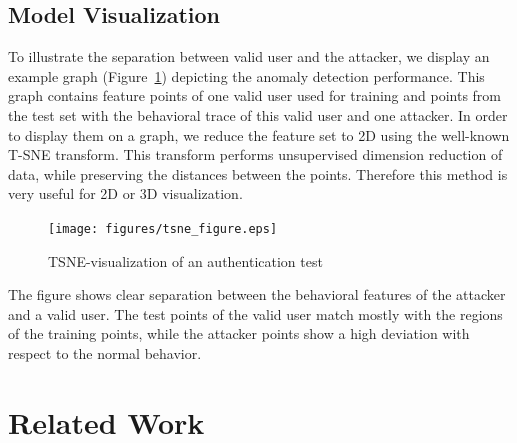 \documentclass{llncs}
\begin{document}
\subsection{Model Visualization}

To illustrate the separation between valid user and the attacker, we display an example graph (Figure~\ref{fig:tsne_result}) depicting the anomaly detection performance. This graph contains feature points of one valid user used for training and points from the test set with the behavioral trace of this valid user and one attacker. In order to display them on a graph, we reduce the feature set to 2D using the well-known T-SNE transform. This transform performs unsupervised dimension reduction of data, while preserving the distances between the points. Therefore this method is very useful for 2D or 3D visualization.

\begin{figure} 

  \centering
    \texttt{[image: figures/tsne\_figure.eps]}
  \caption{TSNE-visualization of an authentication test}
  \label{fig:tsne_result}
  \vspace{-30pt}

\end{figure}

The figure shows clear separation between the behavioral features of the attacker and a valid user. The test points of the valid user match mostly with the regions of the training points, while the attacker points show a high deviation with respect to the normal behavior.


\section{Related Work}
\end{document}
